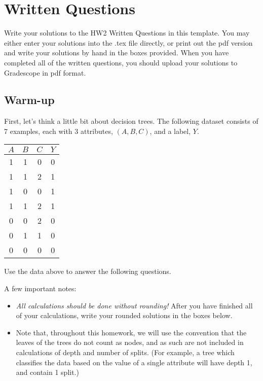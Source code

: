 \section{Written Questions}
\label{sec:written}

Write your solutions to the HW2 Written Questions in this template. You may either enter your solutions into the .tex file directly, or print out the pdf version and write your solutions by hand in the boxes provided.  When you have completed all of the written questions, you should upload your solutions to Gradescope in pdf format.

\subsection{Warm-up}
\label{sec:warmup}

First, let's think a little bit about decision trees. The following dataset consists of 7 examples, each with 3 attributes, $(A,B,C)$, and a label, $Y$.

\begin{center}
\begin{tabular}{|c|c|c|c|}
\hline
$A$ & $B$ & $C$ & $Y$ \\ \hline
1 & 1 & 0 & 0     \\ \hline
1 & 1 & 2 & 1     \\ \hline
1 & 0 & 0 & 1     \\ \hline
1 & 1 & 2 & 1     \\ \hline
0 & 0 & 2 & 0     \\ \hline
0 & 1 & 1 & 0     \\ \hline
0 & 0 & 0 & 0     \\ \hline
\end{tabular}
\end{center}


Use the data above to answer the following questions. 

\begin{notebox}
A few important notes:
\begin{itemize}
    \item \emph{All calculations should be done without rounding!} After you have finished all of your calculations, write your rounded solutions in the boxes below.
    \item Note that, throughout this homework, we will use the convention that the leaves of the trees do not count as nodes, and as such are not included in calculations of depth and number of splits. (For example, a tree which classifies the data based on the value of a single attribute will have depth 1, and contain 1 split.)
\end{itemize}
\end{notebox}

